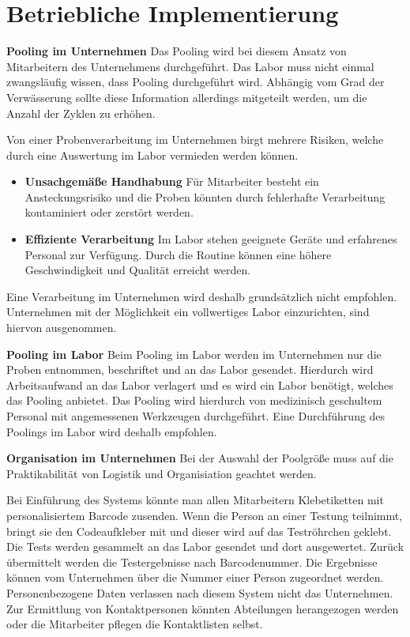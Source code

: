 \section{Betriebliche Implementierung}
\textbf{Pooling im Unternehmen}\newline
Das Pooling wird bei diesem Ansatz von Mitarbeitern des Unternehmens durchgeführt.
Das Labor muss nicht einmal zwangsläufig wissen, dass Pooling durchgeführt wird.
Abhängig vom Grad der Verwässerung sollte diese Information allerdings mitgeteilt werden, um die Anzahl der Zyklen zu erhöhen.

Von einer Probenverarbeitung im Unternehmen birgt mehrere Risiken, welche durch eine Auswertung im Labor vermieden werden können.

\begin{itemize}
	\item \textbf{Unsachgemäße Handhabung}\newline
	Für Mitarbeiter besteht ein Ansteckungsrisiko und die Proben könnten durch fehlerhafte Verarbeitung kontaminiert oder zerstört werden.
	\item \textbf{Effiziente Verarbeitung}\newline
	Im Labor stehen geeignete Geräte und erfahrenes Personal zur Verfügung.
	Durch die Routine können eine höhere Geschwindigkeit und Qualität erreicht werden.
\end{itemize}

Eine Verarbeitung im Unternehmen wird deshalb grundsätzlich nicht empfohlen.
Unternehmen mit der Möglichkeit ein vollwertiges Labor einzurichten, sind hiervon ausgenommen.

\textbf{Pooling im Labor}\newline
Beim Pooling im Labor werden im Unternehmen nur die Proben entnommen, beschriftet und an das Labor gesendet.
Hierdurch wird Arbeitsaufwand an das Labor verlagert und es wird ein Labor benötigt, welches das Pooling anbietet.
Das Pooling wird hierdurch von medizinisch geschultem Personal mit angemessenen Werkzeugen durchgeführt.
Eine Durchführung des Poolings im Labor wird deshalb empfohlen.

\cleardoublepage

\textbf{Organisation im Unternehmen}\newline
Bei der Auswahl der Poolgröße muss auf die Praktikabilität von Logistik und Organisiation geachtet werden.

Bei Einführung des Systems könnte man allen Mitarbeitern Klebetiketten mit personalisiertem Barcode zusenden.
Wenn die Person an einer Testung teilnimmt, bringt sie den Codeaufkleber mit und dieser wird auf das Teströhrchen geklebt.
Die Tests werden gesammelt an das Labor gesendet und dort ausgewertet.
Zurück übermittelt werden die Testergebnisse nach Barcodenummer.
Die Ergebnisse können vom Unternehmen über die Nummer einer Person zugeordnet werden.
Personenbezogene Daten verlassen nach diesem System nicht das Unternehmen.
Zur Ermittlung von Kontaktpersonen könnten Abteilungen herangezogen werden oder die Mitarbeiter pflegen die Kontaktlisten selbst.

